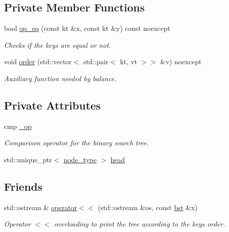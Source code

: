 \subsection*{Private Member Functions}
\begin{DoxyCompactItemize}
\item 
bool \hyperlink{classbst_ad42afa310b7d0a4b4da251cd8bba6897}{op\+\_\+eq} (const kt \&x, const kt \&y) const noexcept
\begin{DoxyCompactList}\small\item\em Checks if the keys are equal or not. \end{DoxyCompactList}\item 
void \hyperlink{classbst_a0dfe021194e7c01cefe01fabad7fc976}{order} (std\+::vector$<$ std\+::pair$<$ kt, vt $>$$>$ \&v) noexcept
\begin{DoxyCompactList}\small\item\em Auxiliary function needed by balance. \end{DoxyCompactList}\end{DoxyCompactItemize}
\subsection*{Private Attributes}
\begin{DoxyCompactItemize}
\item 
\mbox{\label{classbst_a39242fbf17fe707259965efc41555a61}} 
cmp \hyperlink{classbst_a39242fbf17fe707259965efc41555a61}{\+\_\+op}
\begin{DoxyCompactList}\small\item\em Comparison operator for the binary search tree. \end{DoxyCompactList}\item 
std\+::unique\+\_\+ptr$<$ \hyperlink{classbst_a062eb2a1ac54802dbc4f0f74ae2afd01}{node\+\_\+type} $>$ \hyperlink{classbst_ad8177ec5ab205278efdae5ce94d613ba}{head}
\end{DoxyCompactItemize}
\subsection*{Friends}
\begin{DoxyCompactItemize}
\item 
std\+::ostream \& \hyperlink{classbst_ae4b7d69364fca0855f74abdcad674ebf}{operator$<$$<$} (std\+::ostream \&os, const \hyperlink{classbst}{bst} \&x)
\begin{DoxyCompactList}\small\item\em Operator $<$$<$ overloading to print the tree according to the keys order. \end{DoxyCompactList}\end{DoxyCompactItemize}


